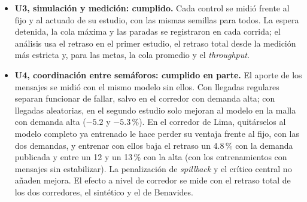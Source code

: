 \begin{itemize}
    estudio, el modelo completo, que además ve los vehículos cercanos,
    mejora a IPPO con mensajes corregido en cuatro de los seis casos; ver
    los vehículos cercanos baja el retraso entre un 5.9 y un 9.7\,\% en
    los tres casos donde el modelo supera al fijo
    (Tabla~\ref{tab:piezas}).
  \item \textbf{U3, simulación y medición: cumplido.} Cada control se
    midió frente al fijo y al actuado de su estudio, con las mismas
    semillas para todos. La espera detenida, la cola máxima y las paradas
    se registraron en cada corrida; el análisis usa el retraso en el
    primer estudio, el retraso total desde la medición más estricta y,
    para las metas, la cola promedio y el \textit{throughput}.
  \item \textbf{U4, coordinación entre semáforos: cumplido en parte.}
    El aporte de los mensajes se midió con el mismo modelo sin ellos.
    Con llegadas regulares separan funcionar de fallar, salvo en el
    corredor con demanda alta; con llegadas aleatorias, en el segundo
    estudio solo mejoran al modelo en la malla con demanda alta ($-5.2$
    y $-5.3$\,\%). En el corredor de Lima, quitárselos al modelo
    completo ya entrenado le hace perder su ventaja frente al fijo, con
    las dos demandas, y entrenar con ellos baja el retraso un 4.8\,\%
    con la demanda publicada y entre un 12 y un 13\,\% con la alta (con
    los entrenamientos con mensajes sin estabilizar).
    La penalización de \textit{spillback} y el
    crítico central no añaden mejora. El efecto a nivel de corredor se
    mide con el retraso total de los dos corredores, el sintético y el de
    Benavides.

\end{itemize}
